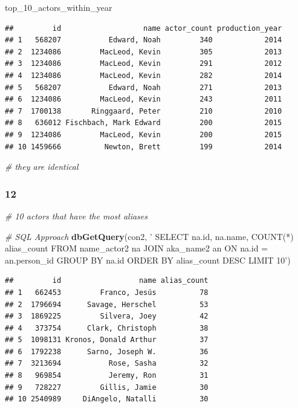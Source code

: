 \documentclass[]{article}
\newenvironment{Shaded}{\begin{snugshade}}{\end{snugshade}}
\newcommand{\KeywordTok}[1]{\textcolor[rgb]{0.13,0.29,0.53}{\textbf{{#1}}}}
\newcommand{\StringTok}[1]{\textcolor[rgb]{0.31,0.60,0.02}{{#1}}}
\newcommand{\CommentTok}[1]{\textcolor[rgb]{0.56,0.35,0.01}{\textit{{#1}}}}
\newcommand{\NormalTok}[1]{{#1}}
\begin{document}
\begin{Shaded}
\begin{Highlighting}[]
\NormalTok{top_10_actors_within_year}
\end{Highlighting}
\end{Shaded}

\begin{verbatim}
##         id                   name actor_count production_year
## 1   568207           Edward, Noah         340            2014
## 2  1234086         MacLeod, Kevin         305            2013
## 3  1234086         MacLeod, Kevin         291            2012
## 4  1234086         MacLeod, Kevin         282            2014
## 5   568207           Edward, Noah         271            2013
## 6  1234086         MacLeod, Kevin         243            2011
## 7  1700138       Ringgaard, Peter         210            2010
## 8   636012 Fischbach, Mark Edward         200            2015
## 9  1234086         MacLeod, Kevin         200            2015
## 10 1459666          Newton, Brett         199            2014
\end{verbatim}

\begin{Shaded}
\begin{Highlighting}[]
\CommentTok{# they are identical}
\end{Highlighting}
\end{Shaded}

\subsubsection{12}\label{section-1}

\begin{Shaded}
\begin{Highlighting}[]
\CommentTok{# 10 actors that have the most aliases}

\CommentTok{# SQL Approach}
\KeywordTok{dbGetQuery}\NormalTok{(con2, }\StringTok{'}
\StringTok{           SELECT na.id, na.name, COUNT(*) alias_count}
\StringTok{           FROM name_actor2 na JOIN aka_name2 an ON na.id = an.person_id}
\StringTok{           GROUP BY na.id}
\StringTok{           ORDER BY alias_count DESC}
\StringTok{           LIMIT 10'}\NormalTok{)}
\end{Highlighting}
\end{Shaded}

\begin{verbatim}
##         id                  name alias_count
## 1   662453         Franco, Jesús          78
## 2  1796694      Savage, Herschel          53
## 3  1869225         Silvera, Joey          42
## 4   373754      Clark, Christoph          38
## 5  1098131 Kronos, Donald Arthur          37
## 6  1792238      Sarno, Joseph W.          36
## 7  3213694           Rose, Sasha          32
## 8   969854           Jeremy, Ron          31
## 9   728227         Gillis, Jamie          30
## 10 2540989     DiAngelo, Natalli          30
\end{verbatim}
\end{document}
